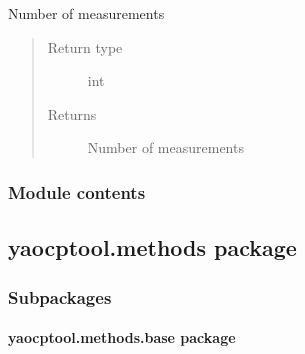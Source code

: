 \documentclass[letterpaper,10pt,english]{sphinxmanual}
\begin{document}
\begin{fulllineitems}
\begin{fulllineitems}
\label{\detokenize{yaocptool.estimation:yaocptool.estimation.unscented_kalman_filter.UnscentedKalmanFilter.estimate}}
\end{fulllineitems}


\begin{fulllineitems}
\label{\detokenize{yaocptool.estimation:yaocptool.estimation.unscented_kalman_filter.UnscentedKalmanFilter.n_meas}}
Number of measurements
\begin{quote}\begin{description}
\item[{Return type}] \leavevmode
int

\item[{Returns}] \leavevmode
Number of measurements

\end{description}\end{quote}

\end{fulllineitems}


\end{fulllineitems}



\subsubsection{Module contents}
\label{\detokenize{yaocptool.estimation:module-yaocptool.estimation}}\label{\detokenize{yaocptool.estimation:module-contents}}

\subsection{yaocptool.methods package}
\label{\detokenize{yaocptool.methods:yaocptool-methods-package}}\label{\detokenize{yaocptool.methods::doc}}

\subsubsection{Subpackages}
\label{\detokenize{yaocptool.methods:subpackages}}

\paragraph{yaocptool.methods.base package}
\label{\detokenize{yaocptool.methods.base:yaocptool-methods-base-package}}\label{\detokenize{yaocptool.methods.base::doc}}
\end{document}
